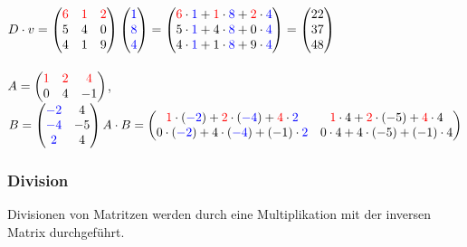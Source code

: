 
$D \cdot v = \begin{pmatrix}
\color{red}6&\color{red}1&\color{red}2\\
5&4&0\\
4&1&9
\end{pmatrix}
\begin{pmatrix}
\color{blue}1\\\color{blue}8\\\color{blue}4
\end{pmatrix}
=
\begin{pmatrix}
{\color{red}6}\cdot{\color{blue}1}+
{\color{red}1}\cdot{\color{blue}8}+
{\color{red}2}\cdot{\color{blue}4}
\\
5\cdot{\color{blue}1}+
4\cdot{\color{blue}8}+
0\cdot{\color{blue}4}
\\
4\cdot{\color{blue}1}+
1\cdot{\color{blue}8}+
9\cdot{\color{blue}4}
\end{pmatrix}
=\begin{pmatrix}
22\\37\\48
\end{pmatrix}$ \\
\\


			$A=\begin{pmatrix}
\color{red}1&\color{red}2&\color{red}4\\
0&4&-1
\end{pmatrix}$, \qquad 
$B =\begin{pmatrix}
\color{blue}-2&4\\
\color{blue}-4&-5\\
\color{blue}2&4
\end{pmatrix}
\\
\\
A \cdot B =
\begin{pmatrix}
{\color{red}1}\cdot({\color{blue}-2})+{\color{red}2}\cdot({\color{blue}-4})+{\color{red}4}\cdot{\color{blue}2} &
{\color{red}1}\cdot 4+{\color{red}2}\cdot(-5)+{\color{red}4}\cdot 4\\
0\cdot ({\color{blue}-2})+4\cdot({\color{blue}-4})+(-1)\cdot {\color{blue}2} &
0\cdot 4+4\cdot(-5)+(-1)\cdot 4
\end{pmatrix}$ \\


			\subsubsection{Division}
			Divisionen von Matritzen werden durch eine Multiplikation mit der inversen Matrix durchgeführt.

